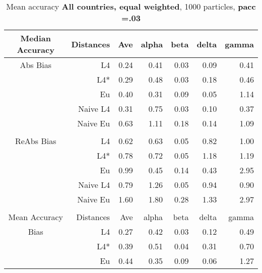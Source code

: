 \documentclass[a4paper,12pt,twoside]{book}
\begin{document}
\begin{table}[H]

\centering
\vfill
\vspace{2cm}
\caption{Mean  accuracy \textbf{All countries, equal weighted}, 1000 particles, \textbf{pacc =.03}}


\begin{tabular}{crrrrrr}

  \hline
  
{\color{blue}Median Accuracy} & Distances & Ave & alpha & beta & delta & gamma \\ 
  \hline
{\color{blue}Abs Bias} & L4  &0.24 & 0.41 & 0.03 & 0.09 & 0.41 \\ 
 
 
&L4*  &  0.29 & 0.48 & 0.03 & 0.18 & 0.46 \\ 
  
  
&Eu &   0.40 & 0.31 & 0.09 & 0.05 & 1.14 \\ 
  
 
&Naive L4&    0.31 & 0.75 & 0.03 & 0.10 & 0.37 \\ 
  
&Naive Eu &   0.63 & 1.11 & 0.18 & 0.14 & 1.09 \\ 
   
   \\ 
  
   \hline
   
{\color{blue} ReAbs Bias } & L4  &0.62 & 0.63 & 0.05 & 0.82 & 1.00 \\ 
  
&L4*  & 
  0.78 & 0.72 & 0.05 & 1.18 & 1.19 \\ 
  
  
&Eu &   
   0.99 & 0.45 & 0.14 & 0.43 & 2.95 \\ 
 
&Naive L4& 0.79 & 1.26 & 0.05 & 0.94 & 0.90 \\  
  
&Naive Eu &     
    1.60 & 1.80 & 0.28 & 1.33 & 2.97 \\ 
  
  \\
   \hline
{\color{blue}Mean Accuracy} & Distances & Ave & alpha & beta & delta & gamma \\ 
  \hline
{\color{blue}Bias} & L4  &0.27 & 0.42 & 0.03 & 0.12 & 0.49 \\ 
 
&L4*  & 0.39 & 0.51 & 0.04 & 0.31 & 0.70 \\ 
  
  
&Eu &   0.44 & 0.35 & 0.09 & 0.06 & 1.27 \\ 
  

\end{tabular}
\end{table}
\end{document}
